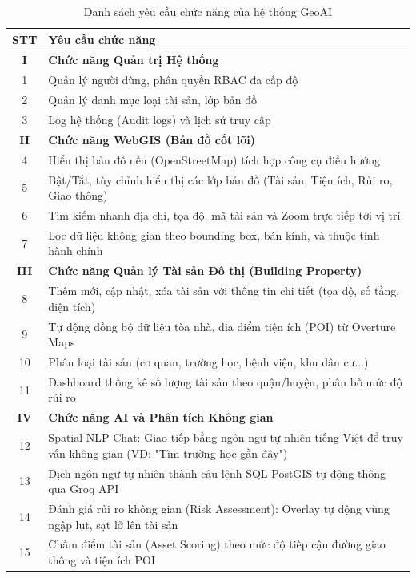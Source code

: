 
\begin{longtable}{|c|p{}|}
        \caption{Danh sách yêu cầu chức năng của hệ thống GeoAI} \label{tab:yeu_cau_chuc_nang} \\

\hline
\rowcolor{gray!25}
\textbf{STT} & \centering\arraybackslash\textbf{Yêu cầu chức năng} \\ \hline
\endfirsthead

\hline
\endhead
\hline
\endfoot
\hline
\endlastfoot

\textbf{I} & \textbf{Chức năng Quản trị Hệ thống} \\ \hline
1 & Quản lý người dùng, phân quyền RBAC đa cấp độ \\ \hline
2 & Quản lý danh mục loại tài sản, lớp bản đồ \\ \hline
3 & Log hệ thống (Audit logs) và lịch sử truy cập \\ \hline

\textbf{II} & \textbf{Chức năng WebGIS (Bản đồ cốt lõi)} \\ \hline
4 & Hiển thị bản đồ nền (OpenStreetMap) tích hợp công cụ điều hướng \\ \hline
5 & Bật/Tắt, tùy chỉnh hiển thị các lớp bản đồ (Tài sản, Tiện ích, Rủi ro, Giao thông) \\ \hline
6 & Tìm kiếm nhanh địa chỉ, tọa độ, mã tài sản và Zoom trực tiếp tới vị trí \\ \hline
7 & Lọc dữ liệu không gian theo bounding box, bán kính, và thuộc tính hành chính \\ \hline

\textbf{III} & \textbf{Chức năng Quản lý Tài sản Đô thị (Building Property)} \\ \hline
8 & Thêm mới, cập nhật, xóa tài sản với thông tin chi tiết (tọa độ, số tầng, diện tích) \\ \hline
9 & Tự động đồng bộ dữ liệu tòa nhà, địa điểm tiện ích (POI) từ Overture Maps \\ \hline
10 & Phân loại tài sản (cơ quan, trường học, bệnh viện, khu dân cư...) \\ \hline
11 & Dashboard thống kê số lượng tài sản theo quận/huyện, phân bố mức độ rủi ro \\ \hline

\textbf{IV} & \textbf{Chức năng AI và Phân tích Không gian} \\ \hline
12 & Spatial NLP Chat: Giao tiếp bằng ngôn ngữ tự nhiên tiếng Việt để truy vấn không gian (VD: "Tìm trường học gần đây") \\ \hline
13 & Dịch ngôn ngữ tự nhiên thành câu lệnh SQL PostGIS tự động thông qua Groq API \\ \hline
14 & Đánh giá rủi ro không gian (Risk Assessment): Overlay tự động vùng ngập lụt, sạt lở lên tài sản \\ \hline
15 & Chấm điểm tài sản (Asset Scoring) theo mức độ tiếp cận đường giao thông và tiện ích POI \\ \hline


\end{longtable}

